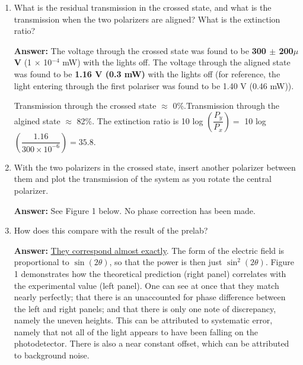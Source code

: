\documentclass[10pt,a4paper]{article}
\begin{document}
\begin{enumerate}
\item What is the residual transmission in the crossed state, and what is the transmission when the two polarizers are aligned? What is the extinction ratio? 

\textbf{Answer:} The voltage through the crossed state was found to be \textbf{300 $\pm$ 200$\mu$V} (1 $\times$ 10$^{-4}$ mW) with the lights off. The voltage through the aligned state was found to be \textbf{1.16 V (0.3 mW)} with the lights off (for reference, the light entering through the first polariser was found to be 1.40 V (0.46 mW)).

Transmission through the crossed state $\approx$ 0\%.Transmission through the algined state $\approx$ 82\%. The extinction ratio is 10 log $\left(\dfrac{P_{y}}{P_{x}}\right) = $ 10 log $\left(\dfrac{1.16}{300 \times 10^{-6}}\right)= 35.8 $. 

\item With the two polarizers in the crossed state, insert another polarizer between them and plot the transmission of the system as you rotate the central polarizer.

\textbf{Answer:} See Figure 1 below. No phase correction has been made.

\item How does this compare with the result of the prelab?

\textbf{Answer:} \ul{They correspond almost exactly}. The form of the electric field is proportional to $\sin(2\theta)$, so that the power is then just $\sin^{2}(2\theta)$. Figure 1 demonstrates how the theoretical prediction (right panel) correlates with the experimental value (left panel). One can see at once that they match nearly perfectly; that there is an unaccounted for phase difference between the left and right panels; and that there is only one note of discrepancy, namely the uneven heights. This can be attributed to systematic error, namely that not all of the light appears to have been falling on the photodetector. There is also a near constant offset, which can be attributed to background noise.
\end{enumerate}
\end{document}

